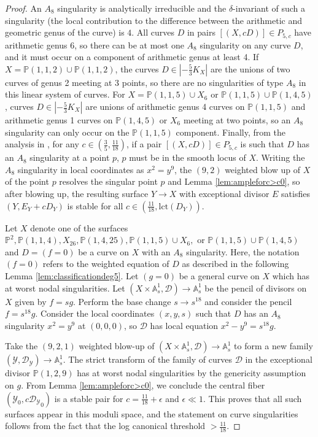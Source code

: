 \documentclass[11pt]{amsart}
\numberwithin{equation}{section}
\theoremstyle{definition}
\newcommand{\calY}{\mathcal{Y}}
\newcommand{\bP}{\mathbb{P}}
\newcommand{\bA}{\mathbb{A}}
\newcommand{\calD}{\mathcal{D}}
\newcommand{\lct}{\mathrm{lct}}
\begin{document}
\begin{proof}
    An $A_8$ singularity is analytically irreducible and the $\delta$-invariant of such a singularity (the local contribution to the difference between the arithmetic and geometric genus of the curve) is $4$.  All curves $D$ in pairs $[(X,cD)] \in P_{5,c}$ have arithmetic genus $6$, so there can be at most one $A_8$ singularity on any curve $D$, and it must occur on a component of arithmetic genus at least 4.  If $X = \bP(1,1,2) \cup \bP(1,1,2)$, the curves $D \in |-\frac{5}{3}K_X|$ are the unions of two curves of genus 2 meeting at 3 points, so there are no singularities of type $A_8$ in this linear system of curves.  For $X = \bP(1,1,5) \cup X_6$ or $\bP(1,1,5) \cup \bP(1,4,5)$, curves $D \in |-\frac{5}{3}K_X|$ are unions of arithmetic genus 4 curves on $\bP(1,1,5)$ and arithmetic genus 1 curves on $\bP(1,4,5)$ or $X_6$ meeting at two points, so an $A_8$ singularity can only occur on the $\bP(1,1,5)$ component. Finally, from the analysis in \cite[Section 11]{hacking}, for any $c\in (\frac{3}{5}, \frac{11}{18})$, if a pair $[(X,cD)] \in P_{5,c}$ is such that $D$ has an $A_8$ singularity at a point $p$, $p$ must be in the smooth locus of $X$.  Writing the $A_8$ singularity in local coordinates as $x^2 = y^9$, the $(9,2)$ weighted blow up of $X$ of the point $p$ resolves the singular point $p$ and Lemma \ref{lem:ampleforc>c0}, so after blowing up, the resulting surface $Y \to X$ with exceptional divisor $E$ satisfies $(Y, E_Y+cD_Y)$ is stable for all $c \in (\frac{11}{18}, \lct(D_Y))$. 

    Let $X$ denote one of the surfaces $\bP^2, \bP(1,1,4), X_{26}, \bP(1,4,25), \bP(1,1,5) \cup X_6,$ or $\bP(1,1,5) \cup \bP(1,4,5)$ and $D = (f = 0)$ be a curve on $X$ with an $A_8$ singularity.  Here, the notation $(f = 0)$ refers to the weighted equation of $D$ as described in the following Lemma \ref{lem:classificationdeg5}.  Let $(g = 0)$ be a general curve on $X$ which has at worst nodal singularities. Let $(X \times \bA^1_s,\calD) \to \bA^1_s$ be the pencil of divisors on $X$ given by $f = s g$.  Perform the base change $s \to s^{18}$ and consider the pencil $f = s^{18} g$.  Consider the local coordinates $(x,y,s)$ such that $D$ has an $A_8$ singularity $x^2 = y^9$ at $(0,0,0)$, so $\calD$ has local equation $x^2 - y^9 = s^{18} g$.

    Take the $(9,2,1)$ weighted blow-up of $(X \times \bA^1_s,\calD) \to \bA^1_s$ to form a new family $(\calY, \calD_{\calY}) \to \bA^1_s$.  The strict transform of the family of curves $\calD$ in the exceptional divisor $\bP(1,2,9)$ has at worst nodal singularities by the genericity assumption on $g$.  From Lemma \ref{lem:ampleforc>c0}, we conclude the central fiber $(\calY_0, c{\calD_{\calY}}_0)$ is a stable pair for $c = \frac{11}{18} + \epsilon$ and $\epsilon \ll 1$.  This proves that all such surfaces appear in this moduli space, and the statement on curve singularities follows from the fact that the log canonical threshold $> \frac{11}{18}$. 


\end{proof}
\end{document}

